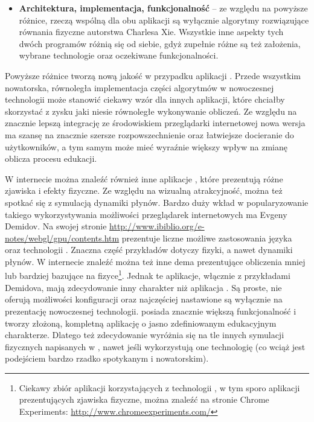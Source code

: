 \begin{itemize}
\item \textbf{Architektura, implementacja, funkcjonalność} -- ze względu na
powyższe różnice, rzeczą wspólną dla obu aplikacji są wyłącznie algorytmy
rozwiązujące równania fizyczne autorstwa Charlesa Xie. Wszystkie inne aspekty
tych dwóch programów różnią się od siebie, gdyż zupełnie różne są też założenia,
wybrane technologie oraz oczekiwane funkcjonalności.

\end{itemize}

Powyższe różnice tworzą nową jakość w przypadku aplikacji \en \js. Przede
wszystkim nowatorska, równoległa implementacja części algorytmów w nowoczesnej
technologii  może stanowić ciekawy wzór dla innych aplikacji, które
chciałby skorzystać z zysku jaki niesie równoległe wykonywanie obliczeń. Ze
względu na znacznie lepszą integrację ze środowiskiem przeglądarki internetowej
nowa wersja ma szansę na znacznie szersze rozpowszechnienie oraz łatwiejsze
docieranie do użytkowników, a tym samym może mieć wyraźnie większy wpływ na
zmianę oblicza procesu edukacji.

W internecie można znaleźć również inne aplikacje \js, które prezentują różne
zjawiska i efekty fizyczne. Ze względu na wizualną atrakcyjność, można też
spotkać się z symulacją dynamiki płynów. Bardzo duży wkład w popularyzowanie
takiego wykorzystywania możliwości przeglądarek internetowych ma Evgeny Demidov.
Na swojej stronie \url{http://www.ibiblio.org/e-notes/webgl/gpu/contents.htm}
prezentuje liczne możliwe zastosowania języka \js oraz technologii .
Znaczna część przykładów dotyczy fizyki, a nawet dynamiki płynów. W internecie
znaleźć można też inne dema prezentujące obliczenia mniej lub bardziej bazujące
na fizyce\footnote{Ciekawy zbiór aplikacji korzystających z technologii
, w tym sporo aplikacji prezentujących zjawiska fizyczne, można
znaleźć na stronie Chrome Experiments: \url{http://www.chromeexperiments.com/}}.
Jednak te aplikacje, włącznie z przykładami Demidova, mają zdecydowanie inny
charakter niż aplikacja \en. Są proste, nie oferują możliwości konfiguracji oraz
najczęściej nastawione są wyłącznie na prezentację nowoczesnej technologii. \en
posiada znacznie większą funkcjonalność i tworzy złożoną, kompletną aplikację o
jasno zdefiniowanym edukacyjnym charakterze. Dlatego też zdecydowanie wyróżnia
się na tle innych symulacji fizycznych napisanych w \js, nawet jeśli
wykorzystują one technologię  (co wciąż jest podejściem bardzo rzadko
spotykanym i nowatorskim).

